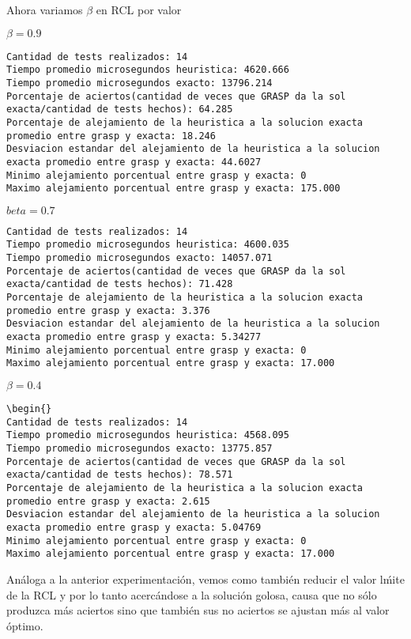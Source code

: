 Ahora variamos $\beta$ en RCL por valor

$\beta = 0.9$
\begin{lstlisting}[frame=single]
Cantidad de tests realizados: 14
Tiempo promedio microsegundos heuristica: 4620.666
Tiempo promedio microsegundos exacto: 13796.214
Porcentaje de aciertos(cantidad de veces que GRASP da la sol exacta/cantidad de tests hechos): 64.285
Porcentaje de alejamiento de la heuristica a la solucion exacta promedio entre grasp y exacta: 18.246
Desviacion estandar del alejamiento de la heuristica a la solucion exacta promedio entre grasp y exacta: 44.6027
Minimo alejamiento porcentual entre grasp y exacta: 0
Maximo alejamiento porcentual entre grasp y exacta: 175.000
\end{lstlisting}

$beta = 0.7$
\begin{lstlisting}[frame=single]
Cantidad de tests realizados: 14
Tiempo promedio microsegundos heuristica: 4600.035
Tiempo promedio microsegundos exacto: 14057.071
Porcentaje de aciertos(cantidad de veces que GRASP da la sol exacta/cantidad de tests hechos): 71.428
Porcentaje de alejamiento de la heuristica a la solucion exacta promedio entre grasp y exacta: 3.376
Desviacion estandar del alejamiento de la heuristica a la solucion exacta promedio entre grasp y exacta: 5.34277
Minimo alejamiento porcentual entre grasp y exacta: 0
Maximo alejamiento porcentual entre grasp y exacta: 17.000
\end{lstlisting}

$\beta = 0.4$

\begin{lstlisting}[frame=single]
\begin{}
Cantidad de tests realizados: 14
Tiempo promedio microsegundos heuristica: 4568.095
Tiempo promedio microsegundos exacto: 13775.857
Porcentaje de aciertos(cantidad de veces que GRASP da la sol exacta/cantidad de tests hechos): 78.571
Porcentaje de alejamiento de la heuristica a la solucion exacta promedio entre grasp y exacta: 2.615
Desviacion estandar del alejamiento de la heuristica a la solucion exacta promedio entre grasp y exacta: 5.04769
Minimo alejamiento porcentual entre grasp y exacta: 0
Maximo alejamiento porcentual entre grasp y exacta: 17.000
\end{lstlisting}

An\'aloga a la anterior experimentaci\'on, vemos como tambi\'en reducir el valor l\'mite de la RCL y por lo tanto acerc\'andose a la soluci\'on golosa, causa que no s\'olo produzca m\'as aciertos sino que tambi\'en sus no aciertos se ajustan m\'as al valor \'optimo.


